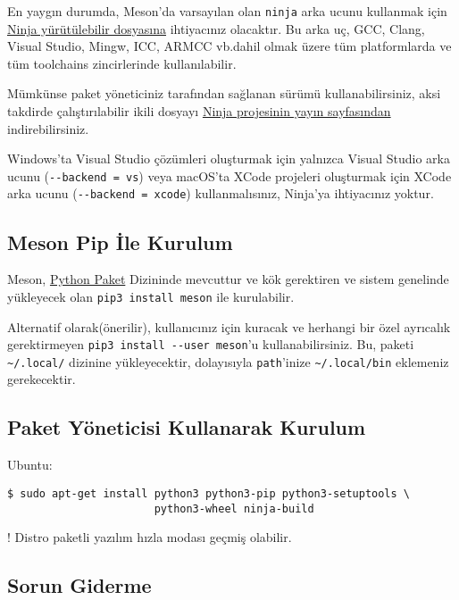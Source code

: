 \documentclass[
]{book}
\begin{document}
En yaygın durumda, Meson'da varsayılan olan \texttt{ninja} arka ucunu kullanmak için \href{https://ninja-build.org/}{Ninja yürütülebilir dosyasına} ihtiyacınız olacaktır. Bu arka uç, GCC, Clang, Visual Studio, Mingw, ICC, ARMCC vb.dahil olmak üzere tüm platformlarda ve tüm toolchains zincirlerinde kullanılabilir.

Mümkünse paket yöneticiniz tarafından sağlanan sürümü kullanabilirsiniz, aksi takdirde çalıştırılabilir ikili dosyayı \href{https://github.com/ninja-build/ninja/releases}{Ninja projesinin yayın sayfasından} indirebilirsiniz.

Windows'ta Visual Studio çözümleri oluşturmak için yalnızca Visual Studio arka ucunu (\texttt{-\/-backend\ =\ vs}) veya macOS'ta XCode projeleri oluşturmak için XCode arka ucunu (\texttt{-\/-backend\ =\ xcode}) kullanmalısınız, Ninja'ya ihtiyacınız yoktur.

\hypertarget{meson-pip-ile-kurulum}{%
\subsection{Meson Pip İle Kurulum}\label{meson-pip-ile-kurulum}}

Meson, \href{https://pypi.org/project/meson/}{Python Paket} Dizininde mevcuttur ve kök gerektiren ve sistem genelinde yükleyecek olan \texttt{pip3\ install\ meson} ile kurulabilir.

Alternatif olarak(önerilir), kullanıcınız için kuracak ve herhangi bir özel ayrıcalık gerektirmeyen \texttt{pip3\ install\ -\/-user\ meson}'u kullanabilirsiniz. Bu, paketi \texttt{\textasciitilde{}/.local/} dizinine yükleyecektir, dolayısıyla \texttt{path}'inize \texttt{\textasciitilde{}/.local/bin} eklemeniz gerekecektir.

\hypertarget{paket-yuxf6neticisi-kullanarak-kurulum}{%
\subsection{Paket Yöneticisi Kullanarak Kurulum}\label{paket-yuxf6neticisi-kullanarak-kurulum}}

Ubuntu:

\begin{verbatim}
$ sudo apt-get install python3 python3-pip python3-setuptools \
                       python3-wheel ninja-build
\end{verbatim}

! Distro paketli yazılım hızla modası geçmiş olabilir.

\hypertarget{sorun-giderme}{%
\subsection{Sorun Giderme}\label{sorun-giderme}}
\end{document}
